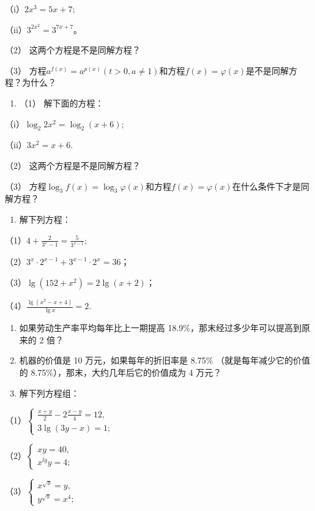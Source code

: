 （i）\(2x^{3} = 5x + 7;\)

（ii）\(3^{2x^2} = 3^{7x + 7}\)。

（2） 这两个方程是不是同解方程？

（3）
方程\(a^{f(x)} = a^{p(x)} (t > 0, a \neq 1)\)和方程\(f(x) = \varphi(x)\)是不是同解方程？为什么？

\begin{enumerate}[start=7]
\item
  （1） 解下面的方程：
\end{enumerate}

（i）\(\log_{2}2x^{2}=\log_{2}(x+6);\)

（ii）\(3x^{2} = x + 6.\)

（2） 这两个方程是不是同解方程？

（3）
方程\(\log_{3}f(x)=\log_{3}\varphi(x)\)和方程\(f(x)=\varphi(x)\)在什么条件下才是同解方程？

\begin{enumerate}[start=8]
\item
  解下列方程：
\end{enumerate}

（1）\(4 + \frac{2}{3^x - 1} = \frac{5}{3^{x - 1}};\)

（2）\(3^x\cdot2^{x-1}+3^{x-1}\cdot2^x=36\)；

（3）\(\lg (152 + x^2) = 2\lg (x + 2)\)；

（4）\(\frac{\lg(x^2 - x + 4)}{\lg x} = 2.\)

\begin{enumerate}[start=9]
\item
  如果劳动生产率平均每年比上一期提高
  18.9\%，那末经过多少年可以提高到原来的 2 倍？
\item
  机器的价值是 10 万元，如果每年的折旧率是 8.75\%
  （就是每年减少它的价值的 8.75\%），那末，大约几年后它的价值成为 4
  万元？
\item
  解下列方程组：
\end{enumerate}

（1）\(\left\{ \begin{array}{l} \frac{x + y}{2} - 2\frac{x - y}{4} = 12, \\ 3\lg (3y - x) = 1; \end{array} \right.\)

（2）\(\left\{ \begin{array}{l} xy = 40, \\ x^{lg}y = 4; \end{array} \right.\)

（3）\(\left\{ \begin{array}{l} x^{\sqrt{y}} = y, \\ y^{\sqrt{y}} = x^{4}; \end{array} \right.\)

